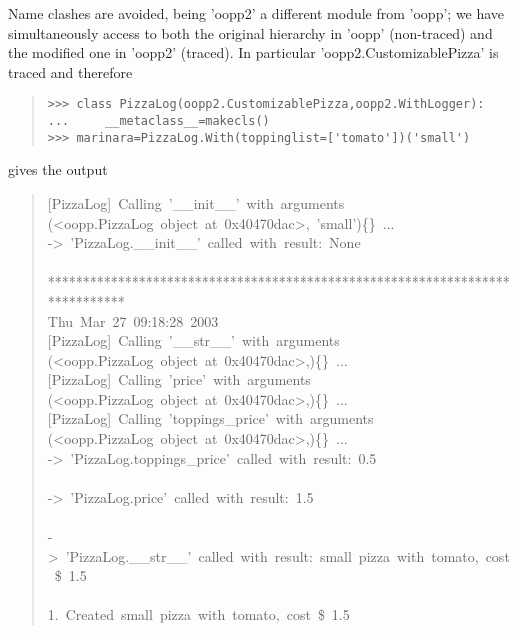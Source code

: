 \documentclass[10pt,english]{article}
\begin{document}
Name clashes are avoided, being 'oopp2' a different module from 
'oopp'; we have simultaneously access to both the original hierarchy
in 'oopp' (non-traced) and the modified one in 'oopp2' (traced).
In particular 'oopp2.CustomizablePizza' is traced and therefore
\begin{quote}
\begin{verbatim}>>> class PizzaLog(oopp2.CustomizablePizza,oopp2.WithLogger):
...     __metaclass__=makecls()
>>> marinara=PizzaLog.With(toppinglist=['tomato'])('small')\end{verbatim}
\end{quote}

gives the output
\begin{quote}
\begin{ttfamily}\begin{flushleft}
\mbox{[PizzaLog]~Calling~'{\_}{\_}init{\_}{\_}'~with~arguments}\\
\mbox{(<oopp.PizzaLog~object~at~0x40470dac>,~'small'){\{}{\}}~...}\\
\mbox{->~'PizzaLog.{\_}{\_}init{\_}{\_}'~called~with~result:~None}\\
\mbox{}\\
\mbox{*****************************************************************************}\\
\mbox{Thu~Mar~27~09:18:28~2003}\\
\mbox{[PizzaLog]~Calling~'{\_}{\_}str{\_}{\_}'~with~arguments}\\
\mbox{(<oopp.PizzaLog~object~at~0x40470dac>,){\{}{\}}~...}\\
\mbox{[PizzaLog]~Calling~'price'~with~arguments}\\
\mbox{(<oopp.PizzaLog~object~at~0x40470dac>,){\{}{\}}~...}\\
\mbox{[PizzaLog]~Calling~'toppings{\_}price'~with~arguments}\\
\mbox{(<oopp.PizzaLog~object~at~0x40470dac>,){\{}{\}}~...}\\
\mbox{->~'PizzaLog.toppings{\_}price'~called~with~result:~0.5}\\
\mbox{}\\
\mbox{->~'PizzaLog.price'~called~with~result:~1.5}\\
\mbox{}\\
\mbox{->~'PizzaLog.{\_}{\_}str{\_}{\_}'~called~with~result:~small~pizza~with~tomato,~cost~{\$}~1.5}\\
\mbox{}\\
\mbox{1.~Created~small~pizza~with~tomato,~cost~{\$}~1.5}
\end{flushleft}\end{ttfamily}
\end{quote}
\end{document}
